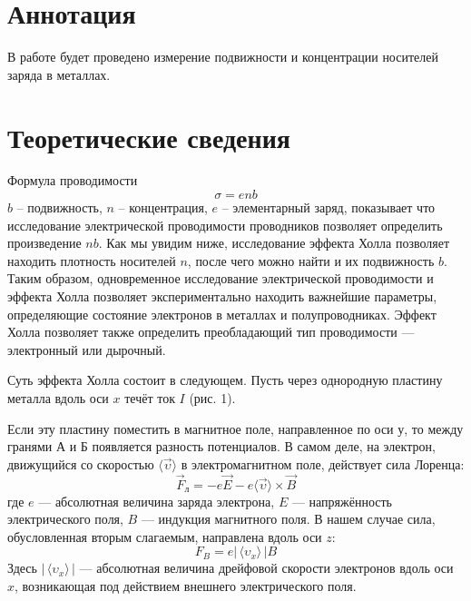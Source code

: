  
\usepackage{multicol}
\usepackage{mathrsfs}
\usepackage{booktabs}


\section{Аннотация}
В работе будет проведено измерение
подвижности и концентрации носителей
заряда в металлах.

\section{Теоретические сведения}

Формула проводимости
\begin{equation}
\sigma = e n b
\end{equation}
$b$ -- подвижность, $n$ --
концентрация, $e$ -- элементарный заряд,
показывает что исследование электрической
проводимости проводников позволяет
определить произведение $nb$. Как мы
увидим ниже, исследование эффекта Холла
позволяет находить плотность носителей
$n$, после чего можно найти и их
подвижность $b$. Таким образом,
одновременное исследование электрической
проводимости и эффекта Холла позволяет
экспериментально находить важнейшие
параметры, определяющие состояние
электронов в металлах и полупроводниках.
Эффект Холла позволяет также определить
преобладающий тип проводимости —
электронный или дырочный.

Суть эффекта Холла состоит в следующем.
Пусть через однородную пластину металла
вдоль оси $x$ течёт ток $I$ (рис. 1).

Если эту пластину поместить в магнитное
поле, направленное по оси у, то между
гранями А и Б появляется разность
потенциалов. В самом деле, на электрон,
движущийся со скоростью $\langle
\vec \upsilon \rangle $ в
электромагнитном поле, действует сила
Лоренца:
\begin{equation}
    \vec F_\text{л} = -e\vec E - e
    \langle \vec \upsilon \rangle \times
    \vec B
\end{equation}
где $e$ — абсолютная величина
заряда электрона, $E$ — напряжённость
электрического поля, $B$ — индукция
магнитного поля. В нашем случае сила,
обусловленная вторым слагаемым,
направлена вдоль оси $z$:
\[
    F_B = e|\,\langle \upsilon_x
    \rangle\, |
    B
\]
Здесь $|\,\langle \upsilon_x \rangle\, |$ — абсолютная величина
дрейфовой скорости электронов вдоль оси
$x$, возникающая под действием внешнего
электрического поля.

